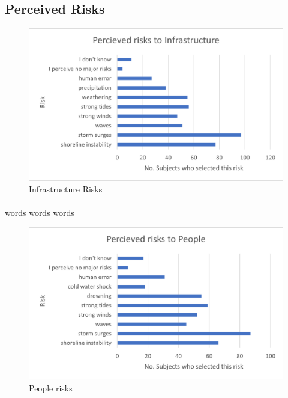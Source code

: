 \paragraph{}

\subsection{Perceived Risks}

\begin{figure}[h]
    \centering
    \includegraphics{fig_results/infrastructure-risks.png}
    \caption{Infrastructure Risks}
    \label{fig:my_label}
\end{figure}
\paragraph{}
words words words

\begin{figure}[h]
    \centering
    \includegraphics{fig_results/people-risks.png}
    \caption{People risks}
    \label{fig:my_label}
\end{figure}
